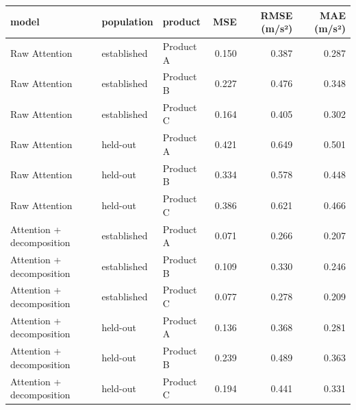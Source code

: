 \begin{tabular}{lllrrr}
\toprule
model & population & product & MSE & RMSE (m/s²) & MAE (m/s²) \\
\midrule
Raw Attention & established & Product A & 0.150 & 0.387 & 0.287 \\
Raw Attention & established & Product B & 0.227 & 0.476 & 0.348 \\
Raw Attention & established & Product C & 0.164 & 0.405 & 0.302 \\
Raw Attention & held-out & Product A & 0.421 & 0.649 & 0.501 \\
Raw Attention & held-out & Product B & 0.334 & 0.578 & 0.448 \\
Raw Attention & held-out & Product C & 0.386 & 0.621 & 0.466 \\
Attention + decomposition & established & Product A & 0.071 & 0.266 & 0.207 \\
Attention + decomposition & established & Product B & 0.109 & 0.330 & 0.246 \\
Attention + decomposition & established & Product C & 0.077 & 0.278 & 0.209 \\
Attention + decomposition & held-out & Product A & 0.136 & 0.368 & 0.281 \\
Attention + decomposition & held-out & Product B & 0.239 & 0.489 & 0.363 \\
Attention + decomposition & held-out & Product C & 0.194 & 0.441 & 0.331 \\
\bottomrule
\end{tabular}
